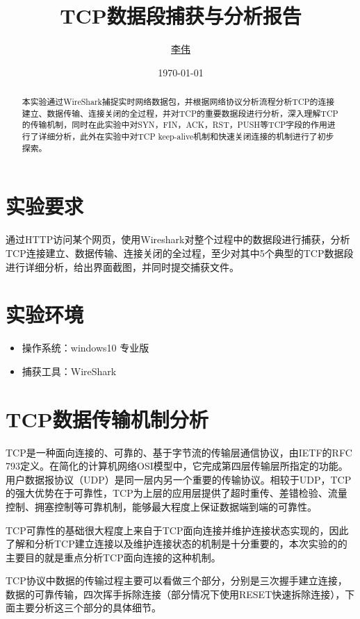 \documentclass[lang=cn,11pt]{elegantpaper}
\title{TCP数据段捕获与分析报告}
\author{\href{https://github.com/Jack-Lio}{李伟}}
\institute{1711350  计算机科学与技术一班}
\date{\today}
\begin{document}
\maketitle

\begin{abstract}
\noindent 本实验通过WireShark捕捉实时网络数据包，并根据网络协议分析流程分析TCP的连接建立、数据传输、连接关闭的全过程，并对TCP的重要数据段进行分析，深入理解TCP的传输机制，同时在此实验中对SYN，FIN，ACK，RST，PUSH等TCP字段的作用进行了详细分析，此外在实验中对TCP keep-alive机制和快速关闭连接的机制进行了初步探索。
\end{abstract}


\section{实验要求}

通过HTTP访问某个网页，使用Wireshark对整个过程中的数据段进行捕获，分析TCP连接建立、数据传输、连接关闭的全过程，至少对其中5个典型的TCP数据段进行详细分析，给出界面截图，并同时提交捕获文件。

\section{实验环境}
\begin{itemize}
	\item 操作系统：windows10 专业版
	\item 捕获工具：WireShark 
\end{itemize}


\section{TCP数据传输机制分析}

TCP是一种面向连接的、可靠的、基于字节流的传输层通信协议，由IETF的RFC 793定义。在简化的计算机网络OSI模型中，它完成第四层传输层所指定的功能。用户数据报协议（UDP）是同一层内另一个重要的传输协议。相较于UDP，TCP的强大优势在于可靠性，TCP为上层的应用层提供了超时重传、差错检验、流量控制、拥塞控制等可靠机制，能够最大程度上保证数据端到端的可靠性。

TCP可靠性的基础很大程度上来自于TCP面向连接并维护连接状态实现的，因此了解和分析TCP建立连接以及维护连接状态的机制是十分重要的，本次实验的的主要目的就是重点分析TCP面向连接的这种机制。

TCP协议中数据的传输过程主要可以看做三个部分，分别是三次握手建立连接，数据的可靠传输，四次挥手拆除连接（部分情况下使用RESET快速拆除连接），下面主要分析这三个部分的具体细节。
\end{document}
